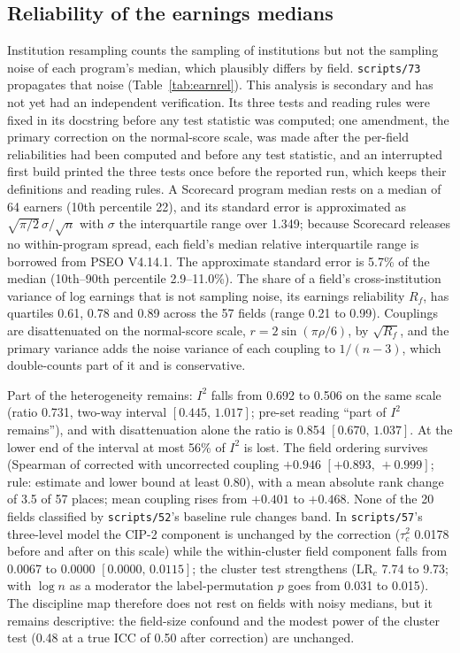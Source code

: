 \documentclass[11pt]{article}
\newcommand{\ci}[2]{$[#1,\allowbreak\,#2]$}
\newcommand{\scr}[1]{\texttt{scripts/#1}}
\begin{document}
\subsection{Reliability of the earnings medians}\label{sec:earnrel}

Institution resampling counts the sampling of institutions but not the sampling noise of each program's median,
which plausibly differs by field. \scr{73} propagates that noise (Table~\ref{tab:earnrel}). This analysis is secondary
and has not yet had an independent verification. Its three tests and reading rules were fixed in its docstring
before any test statistic was computed; one amendment, the primary correction on the normal-score scale, was made
after the per-field reliabilities had been computed and before any test statistic, and an interrupted first build
printed the three tests once before the reported run, which keeps their definitions and reading rules.
A Scorecard program median rests on a median of 64 earners (10th percentile 22), and its standard error is
approximated as $\sqrt{\pi/2}\,\sigma/\sqrt{n}$ with $\sigma$ the interquartile range over 1.349; because Scorecard
releases no within-program spread, each field's median relative interquartile range is borrowed from PSEO
V4.14.1. The approximate standard error is 5.7\% of the median (10th--90th percentile 2.9--11.0\%). The share of a
field's cross-institution variance of log earnings that is not sampling noise, its earnings reliability $R_f$,
has quartiles 0.61, 0.78 and 0.89 across the 57 fields (range 0.21 to 0.99). Couplings are disattenuated on the
normal-score scale, $r=2\sin(\pi\rho/6)$, by $\sqrt{R_f}$, and the primary variance adds the noise variance of each
coupling to $1/(n-3)$, which double-counts part of it and is conservative.

Part of the heterogeneity remains: $I^2$ falls from 0.692 to 0.506 on the same scale (ratio 0.731, two-way
interval \ci{0.445}{1.017}; pre-set reading ``part of $I^2$ remains''), and with disattenuation alone the ratio is
0.854 \ci{0.670}{1.037}. At the lower end of the interval at most 56\% of $I^2$ is lost. The field ordering survives
(Spearman of corrected with uncorrected coupling $+0.946$ \ci{+0.893}{+0.999}; rule: estimate and lower bound at
least 0.80), with a mean absolute rank change of 3.5 of 57 places; mean coupling rises from $+0.401$ to $+0.468$.
None of the 20 fields classified by \scr{52}'s baseline rule changes band. In \scr{57}'s three-level model the CIP-2
component is unchanged by the correction ($\tau^2_c$ 0.0178 before and after on this scale) while the
within-cluster field component falls from 0.0067 to 0.0000 \ci{0.0000}{0.0115}; the cluster test strengthens
($\text{LR}_c$ 7.74 to 9.73; with $\log n$ as a moderator the label-permutation $p$ goes from 0.031 to 0.015).
The discipline map therefore does not rest on fields with noisy medians, but it remains descriptive: the field-size
confound and the modest power of the cluster test (0.48 at a true ICC of 0.50 after correction) are unchanged.
\end{document}
